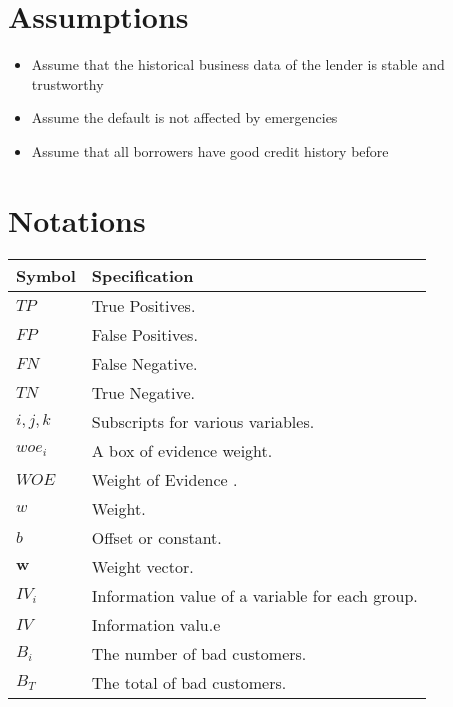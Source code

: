 \documentclass{mcmthesis}
\begin{document}
\section{Assumptions}
\begin{itemize}
\item Assume that the historical business data of the lender is stable and trustworthy
\item Assume the default is not affected by emergencies
\item Assume that all borrowers have good credit history before
\end{itemize}
\newpage
\section{Notations}
\begin{table}[htb]
\centering

\begin{tabular}{ll} 
\toprule

Symbol & Specification \\
\toprule
$TP$ & True Positives. \\

$FP$ & False Positives.\\

$FN$ & False Negative. \\

$TN$ & True Negative. \\

$i,j,k$ & Subscripts for various variables. \\

$woe_i$ & A box of evidence weight. \\

$WOE$ & Weight of Evidence .\\

$w$ & Weight. \\

$b$ & Offset or constant. \\

$\mathbf{w}$ & Weight vector. \\

$IV_i$ & Information value of a variable for each group.  \\

$IV$ & Information valu.e \\

$B_i$ & The number of bad customers. \\

$B_T$ & The total of bad customers. \\


\end{tabular}
\end{table}
\end{document}
